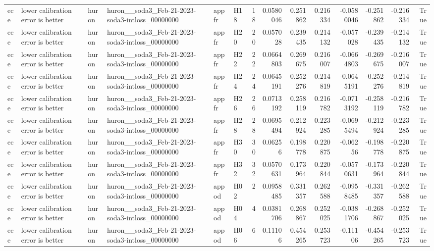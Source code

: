 \begin{longtable}{llllllrrrrrrrr}
ece & lower calibration error is better & huron & huron\_\_soda3\_Feb-21-2023-soda3-intloss\_00000000 & appfr & H18 & 18 & 0.0580046 & 0.251862 & 0.216334 & -0.0580046 & -0.251862 & -0.216334 & True \\
ece & lower calibration error is better & huron & huron\_\_soda3\_Feb-21-2023-soda3-intloss\_00000000 & appfr & H20 & 20 & 0.057028 & 0.239435 & 0.214132 & -0.057028 & -0.239435 & -0.214132 & True \\
ece & lower calibration error is better & huron & huron\_\_soda3\_Feb-21-2023-soda3-intloss\_00000000 & appfr & H22 & 22 & 0.0664803 & 0.269675 & 0.216007 & -0.0664803 & -0.269675 & -0.216007 & True \\
ece & lower calibration error is better & huron & huron\_\_soda3\_Feb-21-2023-soda3-intloss\_00000000 & appfr & H24 & 24 & 0.0645191 & 0.252276 & 0.214819 & -0.0645191 & -0.252276 & -0.214819 & True \\
ece & lower calibration error is better & huron & huron\_\_soda3\_Feb-21-2023-soda3-intloss\_00000000 & appfr & H26 & 26 & 0.0713192 & 0.258119 & 0.216782 & -0.0713192 & -0.258119 & -0.216782 & True \\
ece & lower calibration error is better & huron & huron\_\_soda3\_Feb-21-2023-soda3-intloss\_00000000 & appfr & H28 & 28 & 0.0695494 & 0.212924 & 0.223285 & -0.0695494 & -0.212924 & -0.223285 & True \\
ece & lower calibration error is better & huron & huron\_\_soda3\_Feb-21-2023-soda3-intloss\_00000000 & appfr & H30 & 30 & 0.06256 & 0.198778 & 0.220875 & -0.06256 & -0.198778 & -0.220875 & True \\
ece & lower calibration error is better & huron & huron\_\_soda3\_Feb-21-2023-soda3-intloss\_00000000 & appfr & H32 & 32 & 0.0570631 & 0.173964 & 0.220844 & -0.0570631 & -0.173964 & -0.220844 & True \\
ece & lower calibration error is better & huron & huron\_\_soda3\_Feb-21-2023-soda3-intloss\_00000000 & appod & H02 & 2 & 0.0958485 & 0.331357 & 0.262588 & -0.0958485 & -0.331357 & -0.262588 & True \\
ece & lower calibration error is better & huron & huron\_\_soda3\_Feb-21-2023-soda3-intloss\_00000000 & appod & H04 & 4 & 0.0381706 & 0.268867 & 0.252025 & -0.0381706 & -0.268867 & -0.252025 & True \\
ece & lower calibration error is better & huron & huron\_\_soda3\_Feb-21-2023-soda3-intloss\_00000000 & appod & H06 & 6 & 0.11106 & 0.454265 & 0.253723 & -0.11106 & -0.454265 & -0.253723 & True \\

\end{longtable}

